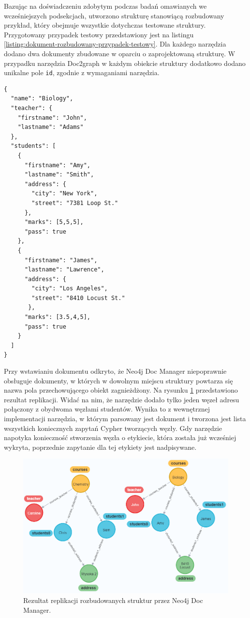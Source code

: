 \documentclass[a4paper,twoside,12pt]{book}
\begin{document}
Bazując na doświadczeniu zdobytym podczas badań omawianych we wcześniejszych podsekcjach, utworzono strukturę stanowiącą rozbudowany przykład, który obejmuje wszystkie dotychczas testowane struktury. Przygotowany przypadek testowy przedstawiony jest na listingu \ref{listing:dokument-rozbudowany-przypadek-testowy}. Dla każdego narzędzia dodano dwa dokumenty zbudowane w oparciu o zaprojektowaną strukturę. W przypadku narzędzia Doc2graph w każdym obiekcie struktury dodatkowo dodano unikalne pole \texttt{id}, zgodnie z wymaganiami narzędzia.

\begin{lstlisting}[style=JSON, caption={Struktura rozbudowanego przypadku testowego.}, label={listing:dokument-rozbudowany-przypadek-testowy}, captionpos=b]
{
  "name": "Biology",
  "teacher": { 
    "firstname": "John",  
    "lastname": "Adams"
  },
  "students": [
    {
      "firstname": "Amy",
      "lastname": "Smith",
      "address": {
        "city": "New York", 
        "street": "7381 Loop St."
      },
      "marks": [5,5,5],
      "pass": true
    },
    {
      "firstname": "James",
      "lastname": "Lawrence",
      "address": {
        "city": "Los Angeles", 
        "street": "8410 Locust St."
       },
      "marks": [3.5,4,5],
      "pass": true
    }
  ]
}
\end{lstlisting}

Przy wstawianiu dokumentu odkryto, że Neo4j Doc Manager niepoprawnie obsługuje dokumenty, w których w dowolnym miejscu struktury powtarza się nazwa pola przechowującego obiekt zagnieżdżony. Na rysunku \ref{fig:graf-rozbudowana-struktura-neo4jdocmanager} przedstawiono rezultat replikacji. Widać na nim, że narzędzie dodało tylko jeden węzeł adresu połączony z obydwoma węzłami studentów. Wynika to z wewnętrznej implementacji narzędzia, w którym parsowany jest dokument i tworzona jest lista wszystkich koniecznych zapytań Cypher tworzących węzły. Gdy narzędzie napotyka konieczność stworzenia węzła o etykiecie, która została już wcześniej wykryta, poprzednie zapytanie dla tej etykiety jest nadpisywane.

\begin{figure}
\centering
\includegraphics[width=14cm]{images/rozbudowana_struktura_neo4jdocmanager.png}
\caption{Rezultat replikacji rozbudowanych struktur przez Neo4j Doc Manager.}
\label{fig:graf-rozbudowana-struktura-neo4jdocmanager}
\end{figure}
\end{document}
